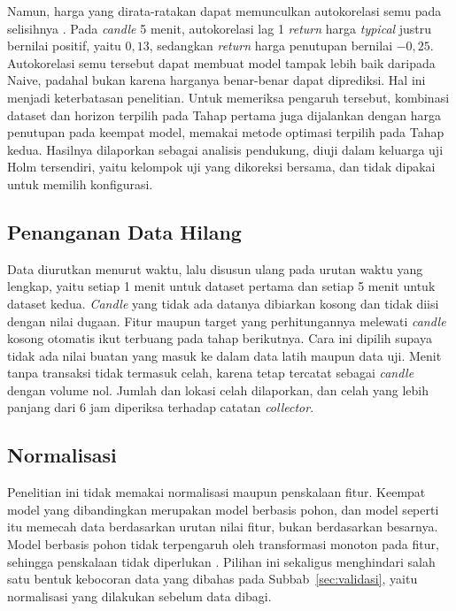 Namun, harga yang dirata-ratakan dapat memunculkan autokorelasi semu pada
selisihnya \cite{working1960}. Pada \textit{candle} 5 menit, autokorelasi
lag 1 \textit{return} harga \textit{typical} justru bernilai positif, yaitu
$0{,}13$, sedangkan \textit{return} harga penutupan bernilai $-0{,}25$.
Autokorelasi semu tersebut dapat
membuat model tampak lebih baik daripada Naive, padahal bukan karena harganya
benar-benar dapat diprediksi. Hal ini menjadi keterbatasan penelitian.
Untuk memeriksa pengaruh tersebut, kombinasi dataset dan horizon terpilih pada
Tahap pertama juga dijalankan dengan harga penutupan pada keempat model,
memakai metode optimasi terpilih pada Tahap kedua. Hasilnya dilaporkan sebagai
analisis pendukung, diuji dalam keluarga uji Holm tersendiri, yaitu kelompok
uji yang dikoreksi bersama, dan tidak dipakai untuk memilih konfigurasi.

\subsection{Penanganan Data Hilang}
Data diurutkan menurut waktu, lalu disusun ulang pada urutan waktu yang lengkap, yaitu setiap 1 menit untuk dataset pertama dan setiap 5 menit untuk dataset
kedua. \textit{Candle} yang tidak ada datanya dibiarkan kosong dan tidak diisi
dengan nilai dugaan. Fitur maupun target yang perhitungannya melewati
\textit{candle} kosong otomatis
ikut terbuang pada tahap berikutnya. Cara ini dipilih supaya tidak ada nilai
buatan yang masuk ke dalam data latih maupun data uji. Menit tanpa transaksi
tidak termasuk celah, karena tetap tercatat sebagai \textit{candle} dengan volume nol. Jumlah dan lokasi celah dilaporkan, dan celah yang lebih panjang dari
6 jam diperiksa terhadap catatan \textit{collector}.

\subsection{Normalisasi}
Penelitian ini tidak memakai normalisasi maupun penskalaan fitur. Keempat
model yang dibandingkan merupakan model berbasis pohon, dan model seperti itu
memecah data berdasarkan urutan nilai fitur, bukan berdasarkan besarnya.
Model berbasis pohon tidak terpengaruh oleh transformasi monoton pada fitur,
sehingga penskalaan tidak diperlukan \cite{hastie2009}.
Pilihan ini sekaligus menghindari salah satu bentuk kebocoran data yang
dibahas pada Subbab~\ref{sec:validasi}, yaitu normalisasi yang dilakukan sebelum data dibagi.

